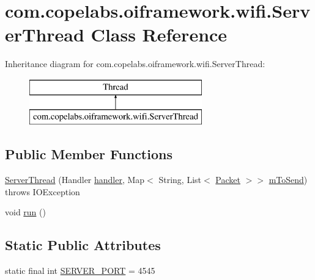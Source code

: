 \hypertarget{classcom_1_1copelabs_1_1oiframework_1_1wifi_1_1_server_thread}{}\section{com.\+copelabs.\+oiframework.\+wifi.\+Server\+Thread Class Reference}
\label{classcom_1_1copelabs_1_1oiframework_1_1wifi_1_1_server_thread}
Inheritance diagram for com.\+copelabs.\+oiframework.\+wifi.\+Server\+Thread\+:\begin{figure}[H]
\begin{center}
\leavevmode
\includegraphics[height=2.000000cm]{classcom_1_1copelabs_1_1oiframework_1_1wifi_1_1_server_thread}
\end{center}
\end{figure}
\subsection*{Public Member Functions}
\begin{DoxyCompactItemize}
\item 
\hyperlink{classcom_1_1copelabs_1_1oiframework_1_1wifi_1_1_server_thread_a2b707824c7757ea46feba5f1b2188859}{Server\+Thread} (Handler \hyperlink{classcom_1_1copelabs_1_1oiframework_1_1wifi_1_1_server_thread_a6407a46f8c994464afa1782d2a7155ce}{handler}, Map$<$ String, List$<$ \hyperlink{classcom_1_1copelabs_1_1oiframework_1_1contentmanager_1_1_packet}{Packet} $>$$>$ \hyperlink{classcom_1_1copelabs_1_1oiframework_1_1wifi_1_1_server_thread_a8e8d2255357f62b00ab191fe1cdd9007}{m\+To\+Send})  throws I\+O\+Exception 
\item 
void \hyperlink{classcom_1_1copelabs_1_1oiframework_1_1wifi_1_1_server_thread_a62aa791f633ca2826de8d3c846197397}{run} ()
\end{DoxyCompactItemize}
\subsection*{Static Public Attributes}
\begin{DoxyCompactItemize}
\item 
static final int \hyperlink{classcom_1_1copelabs_1_1oiframework_1_1wifi_1_1_server_thread_aeafee844e7748efce835f579ec272782}{S\+E\+R\+V\+E\+R\+\_\+\+P\+O\+R\+T} = 4545
\end{DoxyCompactItemize}
